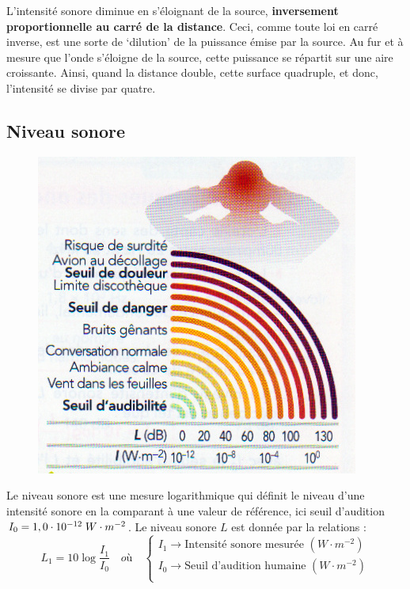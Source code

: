 \documentclass[11pt,a4paper]{article}
\begin{document}
L’intensité sonore diminue en s’éloignant de la source, \textbf{inversement proportionnelle au carré de la distance}. Ceci, comme toute loi en carré inverse, est une sorte de ‘dilution’ de la puissance émise par la source. Au fur et à mesure que l’onde s’éloigne de la source, cette puissance se répartit sur une aire croissante. Ainsi, quand la distance double, cette surface quadruple, et donc, l’intensité se divise par quatre. 

\endgroup
\vspace{1cm}
\subsection{Niveau sonore}
\begingroup
\begin{figure}
  \centering\includegraphics[width=\linewidth]{imgs/p5/niveausonore.jpg}
\end{figure}

Le niveau sonore est une mesure logarithmique qui définit le niveau d’une intensité sonore en la comparant à une valeur de référence, ici seuil d’audition $I_0=1,0\cdot10^{-12}\; W\cdot m^{-2}$. Le niveau sonore $L$ est donnée par la relations : 
\[L_1 = 10\log\dfrac{I_1}{I_0}   \quad où \quad
\begin{cases}
   I_1 \rightarrow \text{Intensité sonore mesurée }(W\cdot m^{-2}) \\
   I_0 \rightarrow \text{Seuil d'audition humaine }(W\cdot m^{-2}) \\ 
\end{cases}
\]
\end{document}
